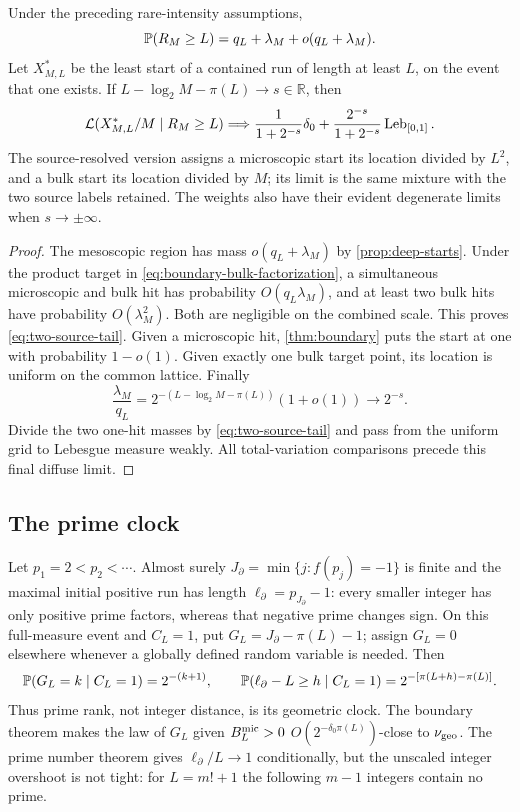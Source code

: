 \begin{theorem}
\label{thm:crossover}
Under the preceding rare-intensity assumptions,
\begin{equation}\label{eq:two-source-tail}
 \mathbb P(R_M\ge L)=q_L+\lambda_M+o(q_L+\lambda_M).
\end{equation}
Let $X^*_{M,L}$ be the least start of a contained run of length at least
$L$, on the event that one exists. If
$L-\log_2M-\pi(L)\to s\in\mathbb R$, then
\begin{equation}\label{eq:crossover-location}
 \mathcal L(X^*_{M,L}/M\mid R_M\ge L)
 \Longrightarrow \frac1{1+2^{-s}}\delta_0+
                         \frac{2^{-s}}{1+2^{-s}}\operatorname{Leb}_{[0,1]}.
\end{equation}
The source-resolved version assigns a microscopic start its location divided
by $L^2$, and a bulk start its location divided by $M$; its limit is the
same mixture with the two source labels retained. The weights also have
their evident degenerate limits when $s\to\pm\infty$.
\end{theorem}
\begin{proof}
The mesoscopic region has mass $o(q_L+\lambda_M)$ by
\cref{prop:deep-starts}. Under the product target in
\eqref{eq:boundary-bulk-factorization}, a simultaneous microscopic and
bulk hit has probability $O(q_L\lambda_M)$, and at least two bulk hits
have probability $O(\lambda_M^2)$. Both are negligible on the combined
scale. This proves \eqref{eq:two-source-tail}.
Given a microscopic hit, \cref{thm:boundary} puts the start at one with
probability $1-o(1)$. Given exactly one bulk target point, its location
is uniform on the common lattice. Finally
\[
 \frac{\lambda_M}{q_L}
   =2^{-(L-\log_2M-\pi(L))}(1+o(1))\longrightarrow2^{-s}.
\]
Divide the two one-hit masses by \eqref{eq:two-source-tail} and pass from
the uniform grid to Lebesgue measure weakly. All total-variation comparisons
precede this final diffuse limit.
\end{proof}

\subsection{The prime clock}\label{sec:prime-clock}
Let $p_1=2<p_2<\cdots$. Almost surely
$J_\partial=\min\{j:f(p_j)=-1\}$ is finite and the maximal initial
positive run has length $\ell_\partial=p_{J_\partial}-1$: every smaller
integer has only positive prime factors, whereas that negative prime
changes sign. On this full-measure event and $C_L=1$, put
$G_L=J_\partial-\pi(L)-1$; assign $G_L=0$ elsewhere whenever a globally
defined random variable is needed. Then
\begin{equation}\label{eq:prime-clock}
 \mathbb P(G_L=k\mid C_L=1)=2^{-(k+1)},\qquad
 \mathbb P(\ell_\partial-L\ge h\mid C_L=1)
                    =2^{-[\pi(L+h)-\pi(L)]}.
\end{equation}
Thus prime rank, not integer distance, is its geometric clock.
The boundary theorem makes the law of $G_L$ given $B_L^{\rm mic}>0$
$O(2^{-\delta_0\pi(L)})$-close to $\nu_{\rm geo}$.
The prime number theorem gives $\ell_\partial/L\to1$ conditionally, but
the unscaled integer overshoot is not tight: for $L=m!+1$ the following
$m-1$ integers contain no prime.

